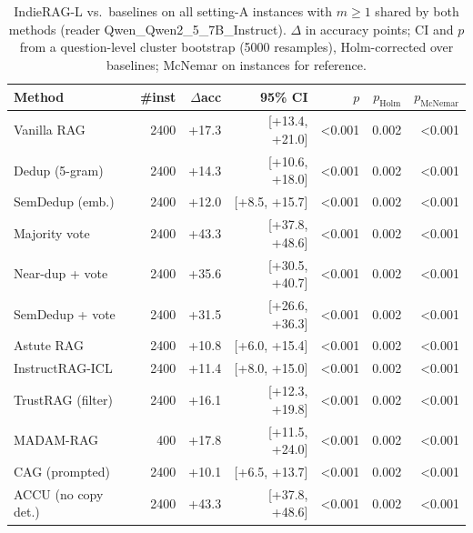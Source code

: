 \begin{table}[tbp]
\centering
\small
\caption{IndieRAG-L vs.\ baselines on all setting-A instances with $m\geq1$ shared by both methods (reader Qwen\_Qwen2\_5\_7B\_Instruct). $\Delta$ in accuracy points; CI and $p$ from a question-level cluster bootstrap (5000 resamples), Holm-corrected over baselines; McNemar on instances for reference.}
\label{tab:sig}
\setlength{\tabcolsep}{4pt}
\begin{tabular}{lrrrrrr}
\toprule
Method & \#inst & $\Delta$acc & 95\% CI & $p$ & $p_{\text{Holm}}$ & $p_{\text{McNemar}}$ \\
\midrule
Vanilla RAG & 2400 & +17.3 & [+13.4, +21.0] & <0.001 & 0.002 & <0.001 \\
Dedup (5-gram) & 2400 & +14.3 & [+10.6, +18.0] & <0.001 & 0.002 & <0.001 \\
SemDedup (emb.) & 2400 & +12.0 & [+8.5, +15.7] & <0.001 & 0.002 & <0.001 \\
Majority vote & 2400 & +43.3 & [+37.8, +48.6] & <0.001 & 0.002 & <0.001 \\
Near-dup + vote & 2400 & +35.6 & [+30.5, +40.7] & <0.001 & 0.002 & <0.001 \\
SemDedup + vote & 2400 & +31.5 & [+26.6, +36.3] & <0.001 & 0.002 & <0.001 \\
Astute RAG & 2400 & +10.8 & [+6.0, +15.4] & <0.001 & 0.002 & <0.001 \\
InstructRAG-ICL & 2400 & +11.4 & [+8.0, +15.0] & <0.001 & 0.002 & <0.001 \\
TrustRAG (filter) & 2400 & +16.1 & [+12.3, +19.8] & <0.001 & 0.002 & <0.001 \\
MADAM-RAG & 400 & +17.8 & [+11.5, +24.0] & <0.001 & 0.002 & <0.001 \\
CAG (prompted) & 2400 & +10.1 & [+6.5, +13.7] & <0.001 & 0.002 & <0.001 \\
ACCU (no copy det.) & 2400 & +43.3 & [+37.8, +48.6] & <0.001 & 0.002 & <0.001 \\
\bottomrule
\end{tabular}
\end{table}
